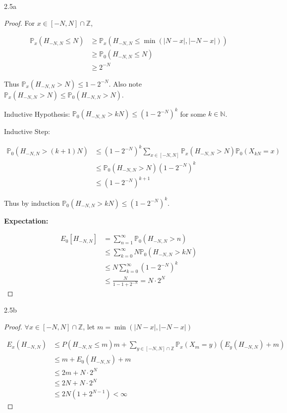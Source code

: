 \documentclass{article}
\newcommand{\PR}{\mathbb{P}}
\newcommand{\Z}{\mathbb{Z}}
\newcommand{\N}{\mathbb{N}}
\newcommand{\abs}[1]{\left\lvert #1\right\rvert}
\begin{document}
\bigskip

\begin{PROB}{2.5a}\label{Problem 2.5a.}
\end{PROB}
\begin{proof}
    For $x \in [-N, N] \cap \Z$, 
    
    \begin{align*}
        \PR_x(H_{-N, N} \leq N) &\geq \PR_x(H_{-N, N} 
        \leq \min(\abs{N - x}, \abs{-N - x})) \\
        &\geq \PR_0(H_{-N, N} \leq N) \\
        &\geq 2^{-N}
    \end{align*}

    Thus $\PR_x(H_{-N, N} > N) \leq 1 - 2^{-N}$. Also note $\PR_x(H_{-N, N} > N) \leq \PR_0(H_{-N, N} > N)$. 

    Inductive Hypothesis: $\PR_0(H_{-N, N} > kN) \leq (1 - 2^{-N})^k$ for some $k \in \N$. 
    
    Inductive Step: 

    \begin{align*}
        \PR_0(H_{-N, N} > (k + 1)N) &\leq (1 - 2^{-N})^k \sum_{x \in \left[-N, N\right]}\PR_x(H_{-N, N} > N) \PR_0(X_{kN} = x) \\
        &\leq \PR_0(H_{-N, N} > N) (1 - 2^{-N})^k  \\
        &\leq (1 - 2^{-N})^{k + 1}
    \end{align*}

    Thus by induction $\PR_0(H_{-N, N} > kN) \leq (1 - 2^{-N})^k$. 

    \textbf{Expectation:}

    \begin{align*}
        E_0[H_{-N, N}] &= \sum_{n = 1}^{\infty} \PR_0(H_{-N, N} > n) \\
        &\leq \sum_{k = 0}^{\infty} N \PR_{0}(H_{-N, N} > kN) \\
        &\leq N \sum_{k = 0}^{\infty} (1 - 2^{-N})^k \\
        &\leq \frac{N}{1 - 1 + 2^{-N}} = N \cdot 2^{N}
    \end{align*}
\end{proof}
\begin{PROB}{2.5b}\label{Problem 2.5b.}
\end{PROB}
\begin{proof}
    $\forall x \in [-N, N] \cap \Z$, let $m = \min(\abs{N - x}, \abs{-N - x})$ 
    
    \begin{align*}
        E_{x}(H_{-N, N}) &\leq P(H_{-N, N} \leq m) m + \sum_{y \in [-N, N] \cap \Z} \PR_x(X_m = y) (E_y(H_{-N , N}) + m) \\
        &\leq m + E_0(H_{-N, N}) + m \\
        &\leq 2m + N \cdot 2^{N} \\
        &\leq 2N + N \cdot 2^{N} \\
        &\leq 2N(1 + 2^{N - 1}) < \infty
    \end{align*}
\end{proof}
\end{document}
